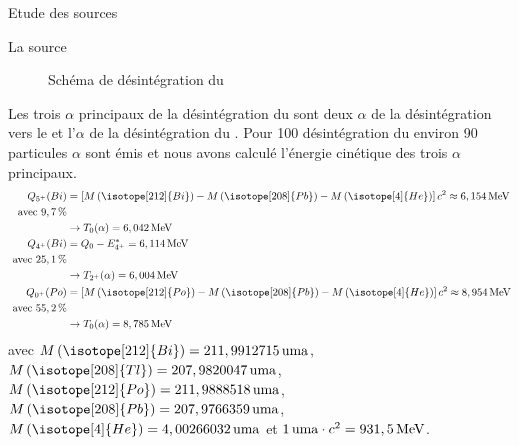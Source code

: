 \documentclass[a4paper,11pt,liststotocnumbered,bibtotocnumbered]{scrartcl}
\begin{document}
\begin{section}{Etude des sources}
\begin{subsection}{La source }
\begin{figure}[H]
\begin{center}
    \end{center}
    \caption{Schéma de désintégration du  }
   \end{figure}
   Les trois $\alpha$ principaux de la désintégration du  sont deux $\alpha$ de la désintégration vers le  et l'$\alpha$ de la désintégration du . Pour 100 désintégration du  environ 90 particules $\alpha$ sont émis et nous avons calculé l'énergie cinétique des trois $\alpha$ principaux.
   \begin{eqnarray*}
    Q_{5^+}(Bi)&=\left[M\left(\isotope[212]{Bi}\right)-M\left(\isotope[208]{Pb}\right)-M\left(\isotope[4]{He}\right)\right]c^2\approx\unit[6,154]{MeV}\\
    \text{ avec }\unit[9,7]{\%}\\
    &\rightarrow T_{0}(\alpha)=\unit[6,042]{MeV}\\
    Q_{4^+}(Bi)&=Q_0-E^*_{4^+}=\unit[6,114]{MeV}\\
    \text{ avec }\unit[25,1]{\%}\\
    &\rightarrow T_{2^+}(\alpha)=\unit[6,004]{MeV}\\
    Q_{0^+}(Po)&=\left[M\left(\isotope[212]{Po}\right)-M\left(\isotope[208]{Pb}\right)-M\left(\isotope[4]{He}\right)\right]c^2\approx\unit[8,954]{MeV}\\
    \text{ avec }\unit[55,2]{\%} \\  
    &\rightarrow T_{0}(\alpha)=\unit[8,785]{MeV}\\
   \end{eqnarray*}
   avec $M\left(\isotope[212]{Bi}\right)=\unit[211,9912715]{uma}$, $M\left(\isotope[208]{Tl}\right)=\unit[207,9820047]{uma}$, $M\left(\isotope[212]{Po}\right)=\unit[211,9888518]{uma}$, $M\left(\isotope[208]{Pb}\right)=\unit[207,9766359]{uma}$, $M\left(\isotope[4]{He}\right)=\unit[4,00266032]{uma}$ et $\unit[1]{uma}\cdot c^2=\unit[931,5]{MeV}$.
  \end{subsection}
 \end{section}
\newpage
\end{document}
